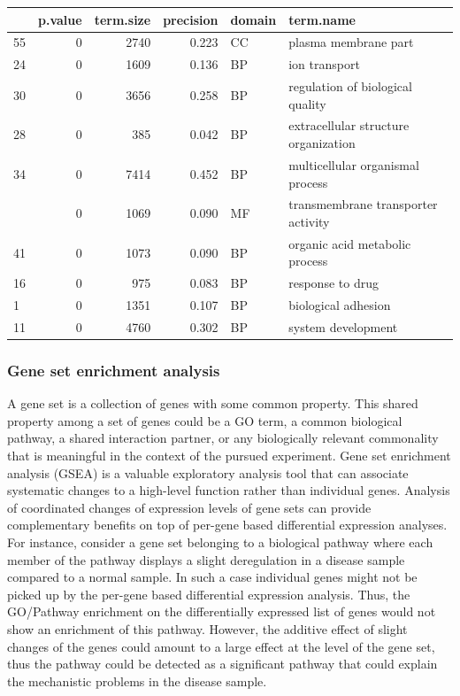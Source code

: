 \documentclass[12pt,]{krantz}
\begin{document}
\begin{tabular}{lrrrll}
\toprule
  & p.value & term.size & precision & domain & term.name\\
\midrule
55 & 0 & 2740 & 0.223 & CC & plasma membrane part\\
24 & 0 & 1609 & 0.136 & BP & ion transport\\
30 & 0 & 3656 & 0.258 & BP & regulation of biological quality\\
28 & 0 & 385 & 0.042 & BP & extracellular structure organization\\
34 & 0 & 7414 & 0.452 & BP & multicellular organismal process\\
\addlinespace
89 & 0 & 1069 & 0.090 & MF & transmembrane transporter activity\\
41 & 0 & 1073 & 0.090 & BP & organic acid metabolic process\\
16 & 0 & 975 & 0.083 & BP & response to drug\\
1 & 0 & 1351 & 0.107 & BP & biological adhesion\\
11 & 0 & 4760 & 0.302 & BP & system development\\
\bottomrule
\end{tabular}

\hypertarget{gene-set-enrichment-analysis}{%
\subsubsection{Gene set enrichment analysis}\label{gene-set-enrichment-analysis}}

A gene set is a collection of genes with some common property. This shared property among a set of genes could be a GO term, a common biological pathway, a shared interaction partner, or any biologically relevant commonality that is meaningful in the context of the pursued experiment. Gene set enrichment analysis (GSEA) is a valuable exploratory analysis tool that can associate systematic changes to a high-level function rather than individual genes. Analysis of coordinated changes of expression levels of gene sets can provide complementary benefits on top of per-gene based differential expression analyses. For instance, consider a gene set belonging to a biological pathway where each member of the pathway displays a slight deregulation in a disease sample compared to a normal sample. In such a case individual genes might not be picked up by the per-gene based differential expression analysis. Thus, the GO/Pathway enrichment on the differentially expressed list of genes would not show an enrichment of this pathway. However, the additive effect of slight changes of the genes could amount to a large effect at the level of the gene set, thus the pathway could be detected as a significant pathway that could explain the mechanistic problems in the disease sample.
\end{document}
